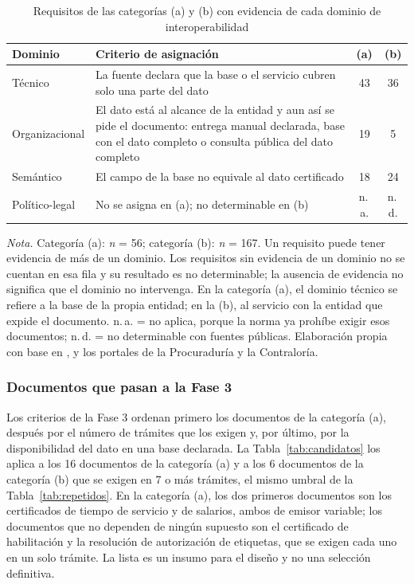 \begin{table}[htbp]
\centering
\caption{Requisitos de las categorías (a) y (b) con evidencia de cada dominio de interoperabilidad}
\label{tab:dominios}
\begin{tabular}{p{2.6cm}p{7.4cm}cc}
\hline
Dominio & Criterio de asignación & (a) & (b) \\
\hline
Técnico & La fuente declara que la base o el servicio cubren solo una parte del dato & 43 & 36 \\
Organizacional & El dato está al alcance de la entidad y aun así se pide el documento: entrega manual declarada, base con el dato completo o consulta pública del dato completo & 19 & 5 \\
Semántico & El campo de la base no equivale al dato certificado & 18 & 24 \\
Político-legal & No se asigna en (a); no determinable en (b) & n.\,a. & n.\,d. \\
\hline
\end{tabular}

\smallskip
\footnotesize\textit{Nota.} Categoría (a): \textit{n} = 56; categoría (b): \textit{n} = 167. Un requisito puede tener evidencia de más de un dominio. Los requisitos sin evidencia de un dominio no se cuentan en esa fila y su resultado es no determinable; la ausencia de evidencia no significa que el dominio no intervenga. En la categoría (a), el dominio técnico se refiere a la base de la propia entidad; en la (b), al servicio con la entidad que expide el documento. n.\,a. = no aplica, porque la norma ya prohíbe exigir esos documentos; n.\,d. = no determinable con fuentes públicas. Elaboración propia con base en \textcite{gobernaciondelhuila2026datosmaestros}, \textcite{funcionpublica2026visorsuit} y los portales de la Procuraduría y la Contraloría.
\end{table}

\subsubsection{Documentos que pasan a la Fase 3}

Los criterios de la Fase 3 ordenan primero los documentos de la categoría (a), después por el número de trámites que los exigen y, por último, por la disponibilidad del dato en una base declarada. La Tabla~\ref{tab:candidatos} los aplica a los 16 documentos de la categoría (a) y a los 6 documentos de la categoría (b) que se exigen en 7 o más trámites, el mismo umbral de la Tabla~\ref{tab:repetidos}. En la categoría (a), los dos primeros documentos son los certificados de tiempo de servicio y de salarios, ambos de emisor variable; los documentos que no dependen de ningún supuesto son el certificado de habilitación y la resolución de autorización de etiquetas, que se exigen cada uno en un solo trámite. La lista es un insumo para el diseño y no una selección definitiva.

